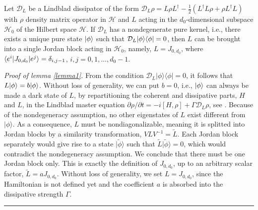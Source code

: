 \documentclass[aps,pra,letterpaper,twocolumn,showpacs,superscriptaddress,floatfix,longbibliography]{revtex4-1}
\newenvironment{proof}[1][Proof]{\noindent\textit{#1.} }{\
  \rule{0.5em}{0.5em}}
\begin{document}
\begin{lemma}
  \label{lemma1}
  Let $\mathcal{D}_L$ be a Lindblad dissipator of the form
  $\mathcal{D}_L\rho = L \rho L^\dag- \frac{1}{2} \left( L^\dag L \rho
    + \rho L^\dag L \right)$ with $\rho$ density matrix operator in
  $\mathcal{H}$ and $L$ acting in the $d_0$-dimensional subspace
  $\mathcal{H}_0$ of the Hilbert space $\mathcal{H}$. If
  $\mathcal{D}_L$ has a nondegenerate pure kernel, i.e., there exists
  a unique pure state $|{\phi}\rangle$ such that $\mathcal{D}_L
  |{\phi}\rangle\langle{\phi}|=0$, then $L$ can be brought into a single Jordan
  block acting in $\mathcal{H}_0$, namely, $L=J_{0,d_0}$, where
  $\langle{e^i}|J_{0,d_0}|{e^j}\rangle=\delta_{i,j-1}$, $i,j=0,1,\dots,d_0-1$.
\end{lemma}
\begin{proof}[Proof of lemma \ref{lemma1}]
  From the condition $\mathcal{D}_{L} | \phi\rangle \langle \phi|=0$,
  it follows that $ L |{\phi}\rangle= b |{\phi}\rangle$.  Without loss of
  generality, we can put $b=0$, i.e., $|{\phi}\rangle$ can always be made
  a dark state of $L$, by repartitioning the coherent and dissipative
  parts, $H$ and $L$, in the Lindblad master equation
  $\partial\rho/\partial t = -i\left[ H,\rho\right] +\Gamma
  \mathcal{D}_L \rho$, see \cite{Yamamoto05,ZollerPRA08}.  Because of
  the nondegeneracy assumption, no other eigenstates of $ L $ exist
  different from $| \phi\rangle$.  As a consequence, $L$ must be
  nondiagonalizable, meaning it is splitted into Jordan blocks by a
  similarity transformation, $V L V^{-1}= {\tilde L}$.  Each Jordan
  block separately would give rise to a state $| {\tilde \phi}\rangle$
  such that ${\tilde L} | {\tilde \phi}\rangle =0$, which would
  contradict the nondegeneracy assumption.  We conclude that there
  must be one Jordan block only. This is exactly the definition of
  $J_{0,d_0}$, up to an arbitrary scalar factor, ${\tilde L}= a
  J_{0,d_0}$. Without loss of generality, we set $L=J_{0,d_0}$, since
  the Hamiltonian is not defined yet and the coefficient $a$ is
  absorbed into the dissipative strength $\Gamma$.
\end{proof}
\end{document}
